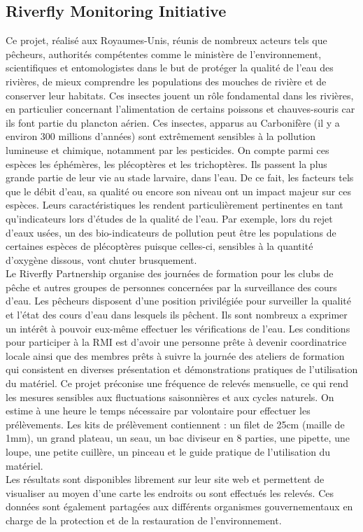 \documentclass[10pt, article]{llncs}
\begin{document}
	\subsection{Riverfly Monitoring Initiative}
		Ce projet, réalisé aux Royaumes-Unis, réunis de nombreux acteurs tels que pêcheurs, authorités compétentes comme le ministère de l'environnement, scientifiques et entomologistes dans le but de protéger la qualité de l'eau des rivières, de mieux comprendre les populations des mouches de rivière et de conserver leur habitats. Ces insectes jouent un rôle fondamental dans les rivières, en particulier concernant l'alimentation de certains poissons et chauves-souris car ils font partie du plancton aérien. Ces insectes, apparus au Carbonifère (il y a environ 300 millions d'années) sont extrêmement sensibles à la pollution lumineuse et chimique, notamment par les pesticides. On compte parmi ces espèces les éphémères, les plécoptères et les trichoptères. Ils passent la plus grande partie de leur vie au stade larvaire, dans l'eau. De ce fait, les facteurs tels que le débit d'eau, sa qualité ou encore son niveau ont un impact majeur sur ces espèces. Leurs caractéristiques les rendent particulièrement pertinentes en tant qu'indicateurs lors d'études de la qualité de l'eau. Par exemple, lors du rejet d'eaux usées, un des bio-indicateurs de pollution peut être les populations de certaines espèces de plécoptères puisque celles-ci, sensibles à la quantité d'oxygène dissous, vont chuter brusquement. \\
		Le Riverfly Partnership organise des journées de formation pour les clubs de pêche et autres groupes de personnes concernées par la surveillance des cours d'eau. Les pêcheurs disposent d'une position privilégiée pour surveiller la qualité et l'état des cours d'eau dans lesquels ils pêchent. Ils sont nombreux a exprimer un intérêt à pouvoir eux-même effectuer les vérifications de l'eau. Les conditions pour participer à la RMI est d'avoir une personne prête à devenir coordinatrice locale ainsi que des membres prêts à suivre la journée des ateliers de formation qui consistent en diverses présentation et démonstrations pratiques de l'utilisation du matériel. 
		Ce projet préconise une fréquence de relevés mensuelle, ce qui rend les mesures sensibles aux fluctuations saisonnières et aux cycles naturels. On estime à une heure le temps nécessaire par volontaire pour effectuer les prélèvements. Les kits de prélèvement contiennent : un filet de 25cm (maille de 1mm), un grand plateau, un seau, un bac diviseur en 8 parties, une pipette, une loupe, une petite cuillère, un pinceau et le guide pratique de l'utilisation du matériel.\\
		Les résultats sont disponibles librement sur leur site web et permettent de visualiser au moyen d'une carte les endroits ou sont effectués les relevés. Ces données sont également partagées aux différents organismes gouvernementaux en charge de la protection et de la restauration de  l'environnement.
	
\end{document}
